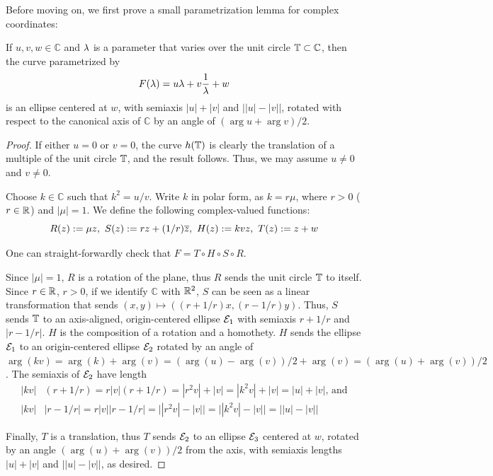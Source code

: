 Before moving on, we first prove a small parametrization lemma for complex coordinates:

\begin{lemma}
If $u,v,w\in\mathbb{C}$ and $\lambda$ is a parameter that varies over the unit circle $\mathbb{T}\subset\mathbb{C}$, then the curve parametrized by
\[ F(\lambda)=u \lambda+v\frac{1}{\lambda}+w \]
is an ellipse centered at $w$, with semiaxis $|u|+|v|$ and $\big||u|-|v|\big|$, rotated with respect to the canonical axis of $\mathbb{C}$ by an angle of $(\arg u+\arg v)/2$.
\label{lem:ell-param}
\end{lemma}

\begin{proof}
If either $u=0$ or $v=0$, the curve $h(\mathbb{T})$ is clearly the translation of a multiple of the unit circle $\mathbb{T}$, and the result follows. Thus, we may assume $u\neq 0$ and $v\neq 0$.

Choose $k\in\mathbb{C}$ such that $k^2=u/v$. Write $k$ in polar form, as $k=r \mu$, where $r>0$ ($r\in\mathbb{R}$) and $|\mu|=1$. We define the following complex-valued functions:
\[R(z):=\mu z,~ S(z):=r z+(1/r) \overline{z},~ H(z):=k v z,~ T(z):=z+w\]

One can straight-forwardly check that $F=T\circ H\circ S\circ R$.

Since $|\mu|=1$, $R$ is a rotation of the plane, thus $R$ sends the unit circle $\mathbb{T}$ to itself. Since $r\in\mathbb{R}$, $r>0$, if we identify $\mathbb{C}$ with $\mathbb{R}^2$, $S$ can be seen as a linear transformation that sends $(x,y)\mapsto\left(\left(r+1/r\right)x,\left(r-1/r\right)y\right)$. Thus, $S$ sends $\mathbb{T}$ to an axis-aligned, origin-centered ellipse $\mathcal{E}_1$ with semiaxis $r+1/r$ and $|r-1/r|$. $H$ is the composition of a rotation and a homothety. $H$ sends the ellipse $\mathcal{E}_1$ to an origin-centered ellipse $\mathcal{E}_2$ rotated by an angle of $\arg(k v)=\arg(k)+\arg(v)=(\arg(u)-\arg(v))/2+\arg(v)=(\arg(u)+\arg(v))/2$. The semiaxis of $\mathcal{E}_2$ have length
\begin{align*}
|k v|&(r+1/r)=r|v|(r+1/r)=|r^2 v|+|v|=|k^2 v|+|v|=|u|+|v|\text{, and}\\
|k v|&|r-1/r|=r|v||r-1/r|=\big||r^2 v|-|v|\big|=\big||k^2 v|-|v|\big|=\big||u|-|v|\big|
\end{align*}

Finally, $T$ is a translation, thus $T$ sends $\mathcal{E}_2$ to an ellipse $\mathcal{E}_3$ centered at $w$, rotated by an angle $(\arg(u)+\arg(v))/2$ from the axis, with semiaxis lengths $|u|+|v|$ and $\big||u|-|v|\big|$, as desired.
\end{proof}

